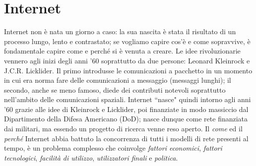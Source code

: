 \section{Internet}
Internet non è nata un giorno a caso: la sua nascita è stata il risultato di un processo lungo, lento e contrastato; se vogliamo capire cos'è e come sopravvive, è fondamentale capire come e perché si è venuta a creare. Le idee rivoluzionarie vennero agli inizi degli anni '60 soprattutto da due persone: Leonard Kleinrock e J.C.R. Licklider. Il primo introdusse le comunicazioni a pacchetto in un momento in cui era norma fare delle comunicazioni a messaggio (messaggi lunghi); il secondo, anche se meno famoso, diede dei contributi notevoli soprattutto nell'ambito delle comunicazioni spaziali. Internet \textquotedblleft nasce" quindi intorno agli anni '60 grazie alle idee di Kleinrock e Licklider, poi finanziate in modo massiccio dal Dipartimento della Difesa Americano (DoD); nasce dunque come rete finanziata dai militari, ma essendo un progetto di ricerca venne reso aperto. Il \textit{come} ed il \textit{perché} Internet abbia battuto la concorrenza di tutti i modelli di rete presenti al tempo, è un problema complesso che coinvolge \textit{fattori economici}, \textit{fattori tecnologici}, \textit{facilità di utilizzo}, \textit{utilizzatori finali} e \textit{politica}.

